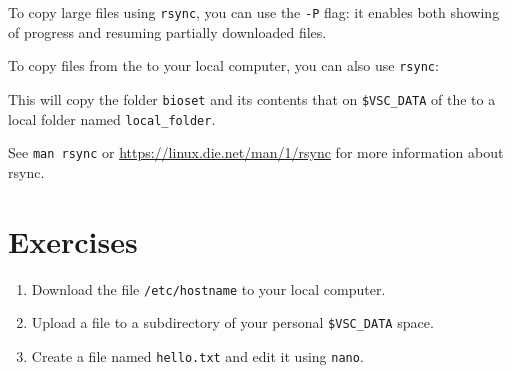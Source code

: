 To copy large files using \verb|rsync|, you can use the \verb|-P| flag: it enables
both showing of progress and resuming partially downloaded files.

To copy files from the \hpc to your local computer, you can also use \verb|rsync|:

\begin{prompt}
\end{prompt}

This will copy the folder \verb|bioset| and its contents that on \verb|$VSC_DATA| of
the \hpc to a local folder named \verb|local_folder|.

See \verb|man rsync| or \url{https://linux.die.net/man/1/rsync} for more information about rsync.

\section{Exercises}

\begin{enumerate}
    \item Download the file \verb|/etc/hostname| to your local computer.
    \item Upload a file to a subdirectory of your personal \verb|$VSC_DATA| space.
    \item Create a file named \verb|hello.txt| and edit it using \verb|nano|.
\end{enumerate}
